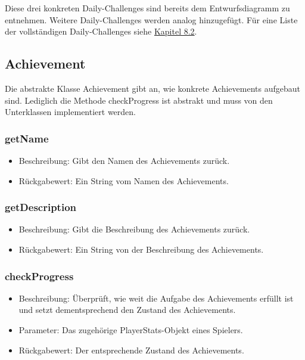 \documentclass[a4paper]{scrreprt}
\begin{document}
    \vspace{8pt}

    Diese drei konkreten Daily-Challenges sind bereits dem Entwurfsdiagramm zu entnehmen. Weitere Daily-Challenges werden analog hinzugefügt. Für eine Liste der vollständigen Daily-Challenges siehe \hyperlink{Daily}{Kapitel 8.2}. \\

    \vspace{8pt}

    \subsection{Achievement}
    Die abstrakte Klasse Achievement gibt an, wie konkrete Achievements aufgebaut sind. Lediglich die Methode checkProgress ist abstrakt und muss von den Unterklassen implementiert werden.

    \subsubsection{getName}
    \begin{itemize}
        \item Beschreibung: Gibt den Namen des Achievements zurück.
        \item Rückgabewert: Ein String vom Namen des Achievements.
    \end{itemize}
    \subsubsection{getDescription}
    \begin{itemize}
        \item Beschreibung: Gibt die Beschreibung des Achievements zurück.
        \item Rückgabewert: Ein String von der Beschreibung des Achievements.
    \end{itemize}
    \subsubsection{checkProgress}
    \begin{itemize}
        \item Beschreibung: Überprüft, wie weit die Aufgabe des Achievements erfüllt ist und setzt dementsprechend den Zustand des Achievements.
        \item Parameter: Das zugehörige PlayerStats-Objekt eines Spielers.
        \item Rückgabewert: Der entsprechende Zustand des Achievements.
    \end{itemize}
\end{document}
